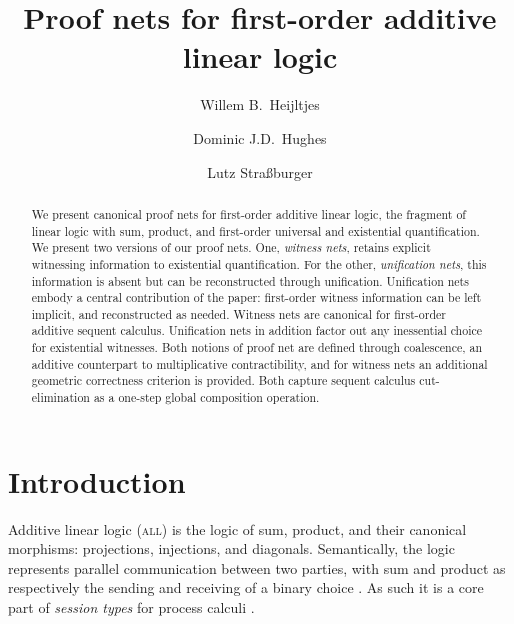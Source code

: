 \documentclass[UKenglish]{lipics-v2019}
\title{Proof nets for first-order additive linear logic}
\author
 {Willem B.\ Heijltjes}
 {University of Bath, United Kingdom}
 {{http://willem.heijltj.es}} %
 {}
 {}
\author
 {Dominic J.D.\ Hughes}
 {Logic Group, UC Berkeley, USA}
 {{http://boole.stanford.edu/\textasciitilde dominic}} %
 {}
 {}
\author
 {Lutz Stra\ss burger}
 {Inria Saclay \&\ LIX/\'Ecole Polytechnique, Palaiseau, France}
 {{http://www.lix.polytechnique.fr/Labo/Lutz.Strassburger}}
 {}
 {}
\newcommand\all{\textsc{all}}
\newcommand\+{+}
\renewcommand\*{\times}
\begin{document}
\maketitle

\begin{abstract}
We present canonical proof nets for first-order additive linear logic, the fragment of linear logic with sum, product, and first-order universal and existential quantification. 
%
We present two versions of our proof nets. One, \emph{witness nets}, retains explicit witnessing information to existential quantification. For the other, \emph{unification nets}, this information is absent but can be reconstructed through unification. Unification nets embody a central contribution of the paper: first-order witness information can be left implicit, and reconstructed as needed. 
%
Witness nets are canonical for first-order additive sequent calculus. Unification nets in addition factor out any inessential choice for existential witnesses. Both notions of proof net are defined through coalescence, an additive counterpart to multiplicative contractibility, and for witness nets an additional geometric correctness criterion is provided. 
% 
Both capture sequent calculus cut-elimination as a one-step global composition operation.
\end{abstract}



\section{Introduction}


Additive linear logic (\all) is the logic of sum, product, and their canonical morphisms: projections, injections, and diagonals. Semantically, the logic represents parallel communication between two parties, with sum and product as respectively the sending and receiving of a binary choice \cite{Joyal-1995, Cockett-Santocanale-2009}. As such it is a core part of \emph{session types} for process calculi \cite{Honda-Vasconcelos-Kubo-1998, Caires-Pfenning-2010, Wadler-2014}.
\end{document}
